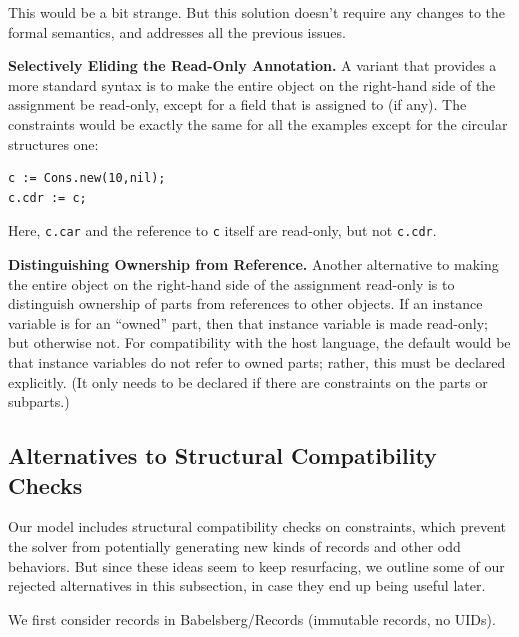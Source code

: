 \documentclass{article}
\newcounter{examples}
\begin{document}
This would be a bit strange.  But this solution doesn't require any
changes to the formal semantics, and addresses all the previous
issues. 

\textbf{Selectively Eliding the Read-Only Annotation.}
A variant that provides a more standard syntax is to make the entire
object on the right-hand side of the assignment be read-only, except
for a field that is assigned to (if any).  The constraints would be
exactly the same for all the examples except for the circular
structures one:

\begin{verbatim}
c := Cons.new(10,nil);
c.cdr := c;
\end{verbatim}

Here, \verb|c.car| and the reference to \verb|c| itself are read-only, but not
\verb|c.cdr|.

\textbf{Distinguishing Ownership from Reference.}  Another alternative to
making the entire object on the right-hand side of the assignment
read-only is to distinguish ownership of parts from references to
other objects.  If an instance variable is for an ``owned'' part, then
that instance variable is made read-only; but otherwise not.  For
compatibility with the host language, the default would be that
instance variables do not refer to owned parts; rather, this must be
declared explicitly.  (It only needs to be declared if there are
constraints on the parts or subparts.)

\subsection{Alternatives to Structural Compatibility Checks}
\label{sec:structural-compatibility-check-alternatives}

Our model includes structural compatibility checks on constraints,
which prevent the solver from potentially generating new kinds of
records and other odd behaviors.  But since these ideas seem to keep
resurfacing, we outline some of our rejected alternatives in this
subsection, in case they end up being useful later.

We first consider records in Babelsberg/Records (immutable records, no UIDs).
\end{document}
